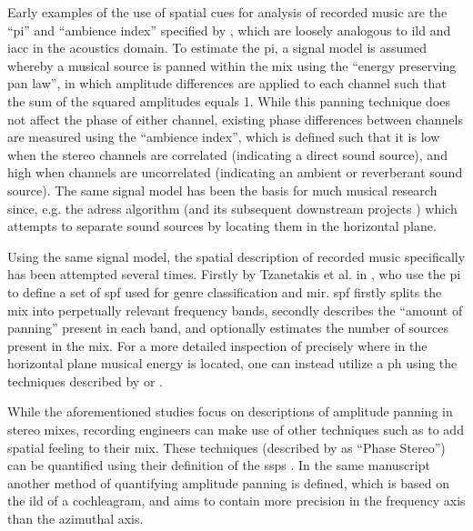 \documentclass[a4paper]{article}
\newcommand{\citeauthorandnumber}[1]{\citeauthor{#1} \cite{#1}}
\begin{document}
Early examples of the use of spatial cues for analysis of recorded music are the \enquote{\gls{pi}} and \enquote{ambience index} specified by \citeauthor{avendanoFrequencyDomainTechniques2002} \cite{avendanoFrequencyDomainTechniques2002}, which are loosely analogous to \gls{ild} and \gls{iacc} in the acoustics domain. To estimate the \gls{pi}, a signal model is assumed whereby a musical source is panned within the mix using the \enquote{energy preserving pan law}, in which amplitude differences are applied to each channel such that the sum of the squared amplitudes equals 1. While this panning technique does not affect the phase of either channel, existing phase differences between channels are measured using the \enquote{ambience index}, which is defined such that it is low when the stereo channels are correlated (indicating a direct sound source), and high when channels are uncorrelated (indicating an ambient or reverberant sound source). The same signal model has been the basis for much musical research since, e.g. the \gls{adress} algorithm \cite{barrySoundSourceSeparation2004} (and its subsequent downstream projects \cite{cooneyEnhancedImplementationADRess2006,sofianosEffectiveSingingVoice2010,defreinReformulatingBinaryMasking2020,defreinRemedyingSoundSource2020}) which attempts to separate sound sources by locating them in the horizontal plane.

Using the same signal model, the spatial description of recorded music specifically has been attempted several times. Firstly by Tzanetakis et al. in \cite{tzanetakisStereoPanningFeatures2007,tzanetakisStereoPanningInformation2010}, who use the \gls{pi} to define a set of \gls{spf} used for genre classification and \gls{mir}. \gls{spf} firstly splits the mix into perpetually relevant frequency bands, secondly describes the \enquote{amount of panning} present in each band, and optionally estimates the number of sources present in the mix. For a more detailed inspection of precisely where in the horizontal plane musical energy is located, one can instead utilize a \gls{ph} using the techniques described by \citeauthorandnumber{sarroffMeasurementsSpaciousnessStereophonic2008} or \citeauthorandnumber{gomezMusicSimilaritySystems2008}.

While the aforementioned studies focus on descriptions of amplitude panning in stereo mixes, recording engineers can make use of other techniques such as to add spatial feeling to their mix. These techniques (described by \citeauthor{tardieuProductionEffectAudio2011} as \enquote{Phase Stereo}) can be quantified using their definition of the \gls{ssps} \cite{tardieuProductionEffectAudio2011}. In the same manuscript another method of quantifying amplitude panning is defined, which is based on the \gls{ild} of a cochleagram, and aims to contain more precision in the frequency axis than the azimuthal axis.
\end{document}
